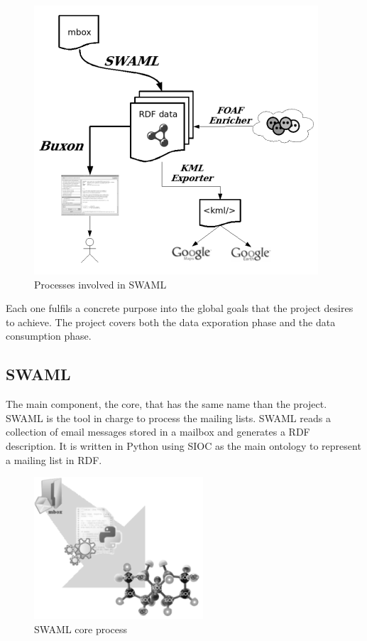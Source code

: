 \documentclass{llncs}
\begin{document}
\begin{figure}[ht]
 \centering
 \includegraphics[bb=0 0 300 283]{images/swaml.png}
 \caption{Processes involved in SWAML}
\end{figure}

Each one fulfils a concrete purpose into the global goals that the 
project desires to achieve. The project covers both the data exporation 
phase and the data consumption phase.

\subsection{SWAML}

The main component, the core, that has the same name than the project. 
SWAML is the tool in charge to process the mailing lists. SWAML reads a 
collection of email messages stored in a mailbox and generates a RDF 
description. It is written in Python using SIOC as the main ontology to 
represent a mailing list in RDF.

\begin{figure}[ht]
 \centering
 \includegraphics[bb=0 0 238 200]{images/swaml-process.png}
 \caption{SWAML core process}
\end{figure}
\end{document}
